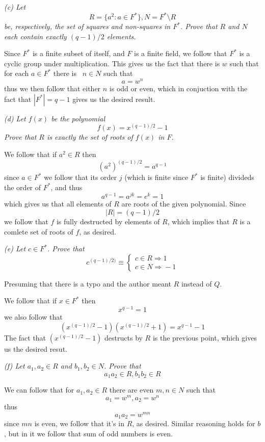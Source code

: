 \documentclass[11pt,oneside,titlepage]{book}
\DeclareMathOperator \ra {\Rightarrow}
\newcommand{\set}[1]{\{ #1 \}}
\begin{document}
\textit{(c) Let
  $$R = \set{a^2: a \in F^*}, N = F^* \setminus R$$
  be, respectively, the set of squares and non-squares in $F^*$. Prove
  that $R$ and $N$ each contain exactly $(q - 1) / 2$ elements.
}

Since $F^*$ is a finite subset of itself, and $F$ is a finite field,
we follow that $F^*$ is a cyclic group under multiplication. This
gives us the fact that there is $w$ such that for each $a \in F^*$
there is \ $n \in N$ such that
$$a = w^n$$
thus we then follow that either $n$ is odd or even, which in
conjuction with the fact that $|F^*| = q - 1$ gives us the desired
result.

\textit{(d) Let $f(x)$ be the polynomial
  $$f(x) = x^{(q - 1)/2} - 1$$
  Prove that $R$ is exactly the set of roots of $f(x)$ in $F$.}

We follow that if $a^2 \in R$ then
$$(a^2)^{(q - 1)/2} = a^{q - 1}$$
since $a \in F^*$ we follow that its order $j$ (which is finite since
$F^*$ is finite) divideds the order of $F^*$, and thus
$$a^{q - 1} = a^{jk} = e^k = 1$$
which gives us that all elements of $R$ are roots of the given
polynomial. Since
$$|R| = (q - 1)  / 2$$
we follow that $f$ is fully destructed by elements of $R$, which
implies that $R$ is a comlete set of roots of $f$, as desired.

\textit{(e) Let $c \in F^*$. Prove that
$$c^{(q - 1)/2)} \equiv
  \begin{cases}
    c \in R \ra 1 \\
    c \in N \ra -1
  \end{cases}
$$}

Presuming that there is a typo and the author meant $R$ instead of $Q$.

We follow that if $x \in F^*$ then
$$x^{q - 1} = 1$$
we also follow that
$$(x^{(q - 1)/2} - 1)(x^{(q - 1)/2} + 1) = x^{q - 1} - 1$$
The fact that $(x^{(q - 1)/2} - 1)$ destructs by $R$ is the previous
point, which gives us the desired resut.

\textit{(f) Let $a_1, a_2 \in R$ and $b_1, b_2 \in N$. Prove that
  $$a_1 a_2 \in R, b_1 b_2 \in R$$
}

We can follow that for $a_1, a_2 \in R$ there are even $m, n \in N$
such that
$$a_1 = w^m, a_2 = w^n$$
thus
$$a_1 a_2 = w^{mn}$$
since $mn$ is even, we follow that it's in $R$, as desired. Similar reasoning holds
for $b$, but in it we follow that sum of odd numbers is even.

\subsection{}
\end{document}
